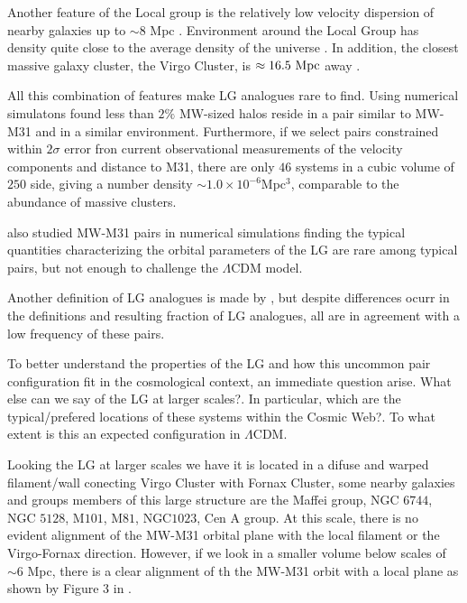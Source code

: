 \documentclass{emulateapj}
\newcommand{\lcdm}{$\Lambda$CDM }
\newcommand{\mpc}{\rm{Mpc}}
\newcommand{\hmpc}{{\ifmmode{h^{-1}{\rm Mpc}}\else{$h^{-1}$Mpc }\fi}}
\begin{document}
Another feature of the Local group is the relatively low velocity
dispersion of nearby galaxies up to $\sim 8$ Mpc \citep[][and
  references therein]{1975ApJ...196..313S,2011MNRAS.415L..16A}. 
Environment around the Local Group has density quite close to the
average density of the universe
\citep{2003ApJ...596...19K,2005AJ....129..178K}. 
In addition, the
closest massive galaxy cluster, the Virgo Cluster, is $\approx
16.5\ \mpc$ away \citep{2007ApJ...655..144M}.  

All this combination of features make LG analogues rare to
find. 
Using numerical simulatons \citet{lganalogues} found less than
$2\%$ MW-sized halos reside in a pair similar to MW-M31 and in a
similar environment. 
Furthermore, if we select pairs constrained
within $2\sigma$ error fron current observational measurements of the
velocity components and distance to M31, there are only $46$ systems
in a cubic volume of $250$ \hmpc side, giving a number density $\sim
1.0\times 10^{-6}$Mpc$^{3}$, comparable to the abundance of massive
clusters.

\citet{2013ApJ...767L...5F} also studied MW-M31 pairs in numerical
simulations finding the typical quantities characterizing the orbital
parameters of the LG are rare among typical pairs, but not enough to
challenge the \lcdm model. 

Another definition of LG analogues is made by
\citet{2008MNRAS.384.1459L}, but despite differences ocurr in the
definitions and resulting fraction of LG analogues, all are in
agreement with a low frequency of these pairs. 

To better understand the properties of the LG and how this uncommon
pair configuration fit in the cosmological context, an immediate
question arise. What else can we say of the LG at larger scales?. In
particular, which are the typical/prefered locations of these systems
within the Cosmic Web?. To what extent is this an expected
configuration in $\Lambda$CDM.

Looking the LG at larger scales we have it is located in a difuse and
warped filament/wall conecting Virgo Cluster with Fornax Cluster, some
nearby galaxies and groups members of this large structure are the
Maffei group, NGC $6744$, NGC $5128$, M$101$, M$81$, NGC$1023$, Cen A
group. At this scale, there is no evident alignment of the MW-M31
orbital plane with the local filament or the Virgo-Fornax
direction. However, if we look in a smaller volume below scales of
$\sim 6$ \mpc, there is a clear alignment of th the MW-M31 orbit with
a local plane as shown by Figure $3$ in \citet{2013AJ....146...69C}.  
\end{document}
